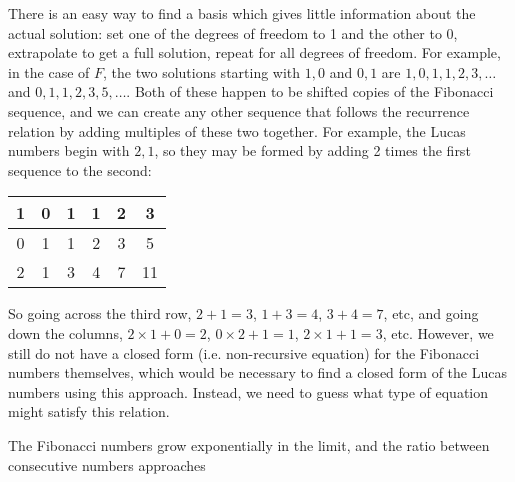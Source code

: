 \documentclass{article}
\begin{document}
There is an easy way to find a basis
which gives little information about the actual solution:
set one of the degrees of freedom to 1 and the other to 0,
extrapolate to get a full solution,
repeat for all degrees of freedom.
For example, in the case of $F$,
the two solutions starting with $1, 0$ and $0, 1$
are $1, 0, 1, 1, 2, 3, \ldots$ and $0, 1, 1, 2, 3, 5, \ldots$.
Both of these happen to be shifted copies of the Fibonacci sequence,
and we can create any other sequence that follows the recurrence relation
by adding multiples of these two together.
For example, the Lucas numbers begin with $2, 1$,
so they may be formed by adding 2 times the first sequence
to the second:
\begin{center}
  \begin{tabular}{|c|c|c|c|c|c|}
    \hline
    1 & 0 & 1 & 1 & 2 & 3 \\ \hline
    0 & 1 & 1 & 2 & 3 & 5 \\ \hline
    2 & 1 & 3 & 4 & 7 & 11 \\ \hline
  \end{tabular}
\end{center}
So going across the third row,
$2+1=3$, $1+3=4$, $3+4=7$, etc,
and going down the columns,
$2 \times 1 + 0 = 2$, $0 \times 2 + 1 = 1$, $2 \times 1 + 1 = 3$, etc.
However, we still do not have a closed form (i.e. non-recursive equation)
for the Fibonacci numbers themselves,
which would be necessary to find a closed form of the Lucas numbers using this approach.
Instead, we need to guess what type of equation might satisfy this relation.

The Fibonacci numbers grow exponentially in the limit,
and the ratio between consecutive numbers approaches



\end{document}
